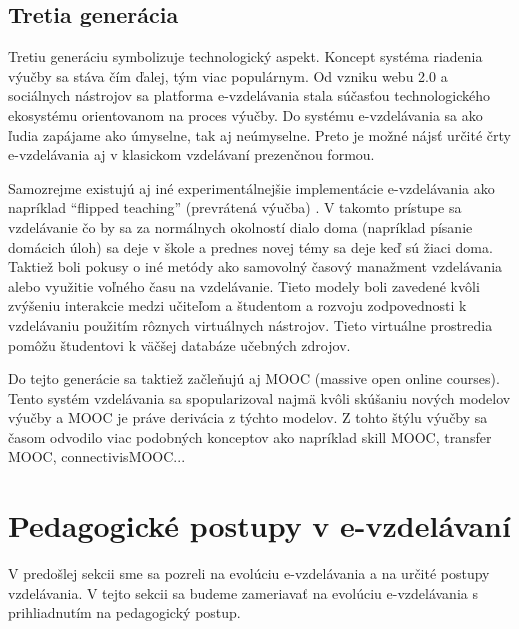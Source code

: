 \documentclass[10pt,slovak,a4paper]{article}
\begin{document}
	\subsection{Tretia generácia}
	Tretiu generáciu symbolizuje technologický aspekt. Koncept systéma riadenia výučby sa stáva čím ďalej, tým viac populárnym. Od vzniku webu 2.0 a sociálnych nástrojov sa platforma e-vzdelávania stala súčasťou technologického ekosystému orientovanom na proces výučby. Do systému e-vzdelávania sa ako ľudia zapájame ako úmyselne, tak aj neúmyselne. Preto je možné nájsť určité črty e-vzdelávania aj v klasickom vzdelávaní prezenčnou formou.

	Samozrejme existujú aj iné experimentálnejšie implementácie e-vzdelávania ako napríklad “flipped teaching” (prevrátená výučba) \cite{baker}\cite{lage}.
	V takomto prístupe sa vzdelávanie čo by sa za normálnych okolností dialo doma (napríklad písanie domácich úloh) sa deje v škole a prednes novej témy sa deje keď sú žiaci doma. Taktiež boli pokusy o iné metódy ako samovolný časový manažment vzdelávania alebo využitie voľného času na vzdelávanie. Tieto modely boli zavedené kvôli zvýšeniu interakcie medzi učiteľom a študentom a rozvoju zodpovednosti k vzdelávaniu použitím rôznych virtuálnych nástrojov. Tieto virtuálne prostredia pomôžu študentovi k väčšej databáze učebných zdrojov.

	Do tejto generácie sa taktiež začleňujú aj MOOC (massive open online courses). Tento systém vzdelávania sa spopularizoval najmä kvôli skúšaniu nových modelov výučby a MOOC je práve derivácia z týchto modelov. Z tohto štýlu výučby sa časom odvodilo viac podobných konceptov ako napríklad skill MOOC, transfer MOOC, connectivisMOOC...
	\cite{main}
\section{Pedagogické postupy v e-vzdelávaní} \label{pedagogicalApproaches}
	V predošlej sekcii sme sa pozreli na evolúciu e-vzdelávania a na určité postupy vzdelávania. V tejto sekcii sa budeme zameriavať na evolúciu e-vzdelávania s prihliadnutím na pedagogický postup.
\end{document}
